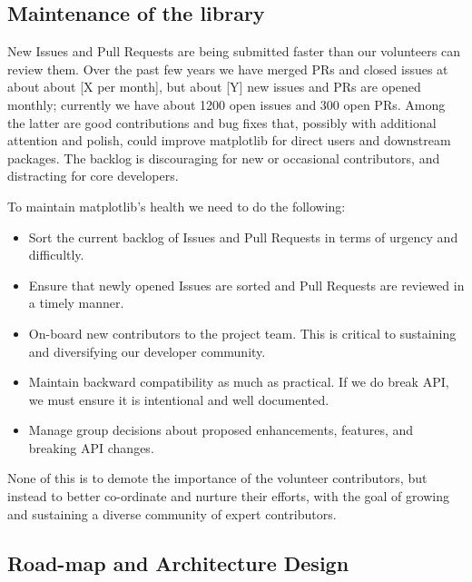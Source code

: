 \documentclass[11pt]{article}  %
\begin{document}
\subsection{Maintenance of the library}

New Issues and Pull Requests are being submitted faster than our
volunteers can review them.
Over the past few years we have merged PRs and closed
issues at about about [X per month], but about [Y] new issues and PRs
are opened monthly; currently we have about 1200 open issues and
300 open PRs.  Among the latter are good contributions and bug fixes
that, possibly with additional attention and polish, could improve
matplotlib for direct users and downstream packages.  The backlog is
discouraging for new or occasional contributors, and distracting for
core developers.

To maintain matplotlib's health we need to do the following:

\begin{itemize}
\item Sort the current backlog of Issues and Pull Requests
  in terms of urgency and difficultly.
\item Ensure that newly opened Issues are sorted and Pull Requests
  are reviewed in a timely manner.
\item On-board new contributors to the project team.  This is
  critical to sustaining and diversifying our developer community.
\item Maintain backward compatibility as much as practical.  If we
  do break API, we must ensure it is intentional and well documented.
\item Manage group decisions about proposed enhancements, features, and
  breaking API changes.
\end{itemize}

None of this is to demote the importance of the volunteer
contributors, but instead to better co-ordinate and nurture their
efforts, with the goal of growing and sustaining a diverse community
of expert contributors.

\subsection{Road-map and Architecture Design}
\end{document}
